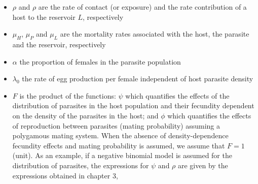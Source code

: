 \documentclass[12pt,a4paper]{article}
\theoremstyle{plain}%
\theoremstyle{definition}
\theoremstyle{remark}
\begin{document}
	\begin{itemize}
		\item %
		$\rho$ and $\rho$ are the rate of contact (or exposure) and the rate contribution of a host to the reservoir $L$, respectively
		\item $\mu_H$, $\mu_P$ and $\mu_L$ 
		are the mortality rates associated with the host, the parasite and the reservoir, respectively
		\item $\alpha$ %
		the proportion of females in the parasite population
		\item $\lambda_0$ %
		the rate of egg production per female independent of host parasite density
		\item $F$ %
		is the product of the functions: $\psi$ which quantifies the effects of the distribution of parasites in the host population and their fecundity dependent on the density of the parasites in the host; and $\phi$ which quantifies the effects of reproduction between parasites (mating probability) assuming a polygamous mating system. When the absence of density-dependence fecundity effects and mating probability is assumed, we assume that $F = 1$ (unit). As an example, if a negative binomial model is assumed for the distribution of parasites, the expressions for $\psi$ and $\rho$ are given by the expressions obtained in chapter 3,
		
		
		

\end{itemize}
\end{document}
